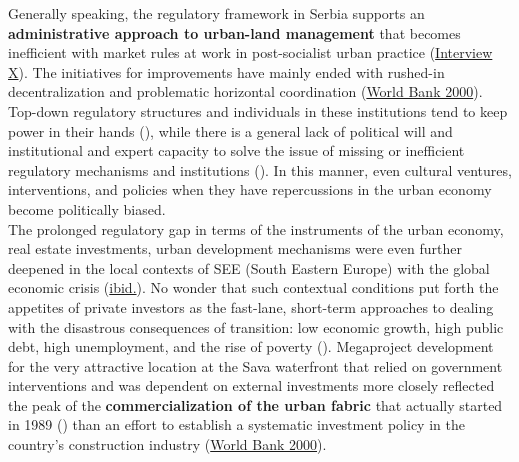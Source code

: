 \documentclass[11pt]{report}
\begin{document}
{{{{Generally speaking, the regulatory framework in Serbia supports an \textbf{administrative approach to urban-land management} that becomes inefficient with market rules at work in post-socialist urban practice
(\href{InterviewX}{Interview X}).
The initiatives for improvements have mainly ended with rushed-in decentralization and problematic horizontal coordination
(\href{World Bank}{World Bank 2000}).
Top-down regulatory structures and individuals in these institutions tend to keep power in their hands (\href{ref}{\citealt{vujovic_belgrades_2007}}), while there is a general lack of political will and institutional and expert capacity to solve the issue of missing or inefficient regulatory mechanisms and institutions (\href{ref}{\citealt{zekovic_planning_2015}}).
In this manner, even cultural ventures, interventions, and policies when they have repercussions in the urban economy become politically biased.
\\

The prolonged regulatory gap in terms of the  instruments  of  the  urban economy, real estate investments, urban development mechanisms were even further deepened in the local contexts of SEE (South Eastern Europe) with the global economic crisis 
(\href{Zekovic}{ibid.}).
No wonder that such contextual conditions put forth the appetites of private investors as the fast-lane, short-term approaches to dealing with the disastrous consequences of transition: low economic growth, high public debt, high unemployment, and the rise of poverty (\href{ref}{\citealt{world_bank_cities_2000}}).
Megaproject development for the very attractive location at the Sava waterfront that relied on government interventions and was dependent on external investments more  closely reflected the peak of the  \textbf{commercialization of the urban fabric} that actually started in 1989 (\href{ref}{\citealt{hirt_belgrade_2009}}) than an effort to establish a systematic investment policy in the country's construction industry (\href{World Bank}{World Bank 2000}).
\\

}}}}
\end{document}
